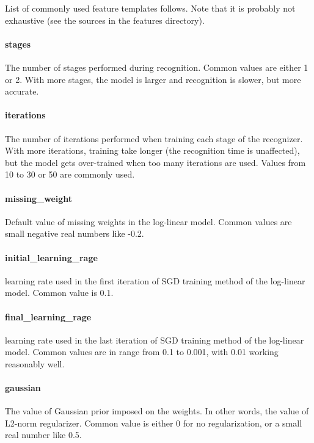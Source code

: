 List of commonly used feature templates follows. Note that it is probably not
exhaustive (see the sources in the features directory).


\paragraph{stages}
The number of stages performed during recognition. Common values are either 1 or
2. With more stages, the model is larger and recognition is slower, but more accurate.

\paragraph{iterations}
The number of iterations performed when training each stage of the recognizer.
With more iterations, training take longer (the recognition time is unaffected),
but the model gets over-trained when too many iterations are used. Values from 10
to 30 or 50 are commonly used.

\paragraph{missing\_weight}
Default value of missing weights in the log-linear model. Common values are small
negative real numbers like -0.2.

\paragraph{initial\_learning\_rage} 
learning rate used in the first iteration of SGD training method of the log-linear
model. Common value is 0.1.

\paragraph{final\_learning\_rage} 
learning rate used in the last iteration of SGD training method of the log-linear
model. Common values are in range from 0.1 to 0.001, with 0.01 working reasonably well.

\paragraph{gaussian}
The value of Gaussian prior imposed on the weights. In other words, the value of
L2-norm regularizer. Common value is either 0 for no regularization, or a small
real number like 0.5.


